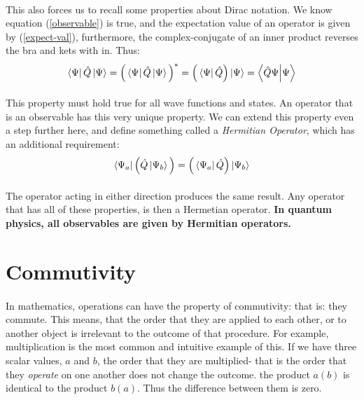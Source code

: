 \documentclass[12pt,letterpaper]{book}
\begin{document}
\paragraph*{}This also forces us to recall some properties about Dirac notation. We know equation (\ref{observable}) is true, and the expectation value of an operator is given by (\ref{expect-val}), furthermore, the complex-conjugate of an inner product reverses the bra and kets with in. Thus:
\begin{equation}
\bra{\Psi}\hat{Q}\ket{\Psi} = 
\Big(\bra{\Psi}\hat{Q}\ket{\Psi}\Big)^* = 
\Big(\bra{\Psi}\hat{Q}\Big)\ket{\Psi} = 
\bra{\hat{Q}\Psi}\ket{\Psi}
\end{equation}
\paragraph*{}This property must hold true for all wave functions and states. An operator that is an observable has this very unique property. We can extend this property even a step further here, and define something called a \textit{Hermitian Operator}, which has an additional requirement:
\begin{equation}
\bra{\Psi_a}\Big(\hat{Q}\ket{\Psi_b}\Big) = 
\Big(\bra{\Psi_a}\hat{Q}\Big)\ket{\Psi_b}
\end{equation}
\paragraph*{}The operator acting in either direction produces the same result. Any operator that has all of these properties, is then a Hermetian operator. \textbf{In quantum physics, all observables are given by Hermitian operators.}


\section{Commutivity}
\paragraph*{}In mathematics, operations can have the property of commutivity: that is: they commute. This means, that the order that they are applied to each other, or to another object is irrelevant to the outcome of that procedure. For example, multiplication is the most common and intuitive example of this. If we have three scalar values, $a$ and $b$, the order that they are multiplied- that is the order that they \textit{operate} on one another does not change the outcome. the product $a(b)$ is identical to the product $b(a)$. Thus the difference between them is zero.
\end{document}
